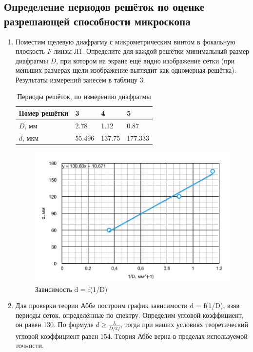 \documentclass[a4paper]{article}
\begin{document}
\subsection{Определение периодов решёток по оценке разрешающей способности микроскопа}
\begin{enumerate}
    \item Поместим щелевую диафрагму с микрометрическим винтом в фокальную плоскость $F$ линзы Л1. Определите для каждой решётки минимальный размер диафрагмы $D$, при котором на экране ещё видно изображение сетки (при меньших размерах щели изображение выглядит
как одномерная решётка). Результаты измерений занесём в таблицу 3.

        \begin{table}[h]
    \centering
    \begin{center}
    \caption{Периоды решёток, по измерению диафрагмы}
    \end{center}
    \vspace{0.1cm}
    \label{tab:my_label}
    \begin{tabular}{ |p{2.5cm}||p{1cm}|p{1cm}|p{1cm}|}
 \hline
Номер решётки &  3 & 4 & 5\\
 \hline
 $D$, мм  & 2.78 & 1.12 & 0.87 \\
 \hline
 $d$, мкм  & 55.496 & 137.75 & 177.333 \\

 \hline
 
\end{tabular}
\end{table}

    \begin{figure}[h]
    \centering
    \includegraphics[width=13cm]{fig3.PNG}
    \caption{Зависимость d = f(1/D)}
    \label{fig:vac}
\end{figure}

\item Для проверки теории Аббе построим график зависимости d = f(1/D), взяв периоды сеток, определённые по спектру. Определим угловой коэффициент, он равен 130. По формуле $d \ge \frac{\lambda}{D/2f}$, тогда при наших условиях теоретический угловой коэффициент равен 154. Теория Аббе верна в пределах используемой точности.

\end{enumerate}
\end{document}
